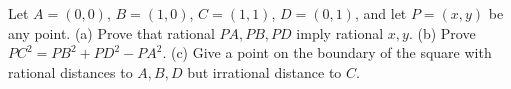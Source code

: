 Let $A=(0,0)$, $B=(1,0)$, $C=(1,1)$, $D=(0,1)$, and let $P=(x,y)$ be any point. (a) Prove that rational $PA,PB,PD$ imply rational $x,y$. (b) Prove $PC^2=PB^2+PD^2-PA^2$. (c) Give a point on the boundary of the square with rational distances to $A,B,D$ but irrational distance to $C$.
